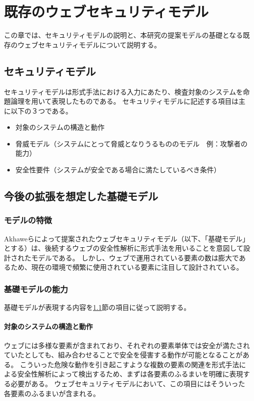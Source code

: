 \documentclass[12pt,a4paper]{jbook}
\begin{document}
\chapter{既存のウェブセキュリティモデル}
\label{sec:existing-model}
この章では、セキュリティモデルの説明と、本研究の提案モデルの基礎となる既存のウェブセキュリティモデルについて説明する。

\section{セキュリティモデル}
\label{sec:SecurityModel}
セキュリティモデルは形式手法における入力にあたり、検査対象のシステムを命題論理を用いて表現したものである。
セキュリティモデルに記述する項目は主に以下の３つである。
\begin{itemize}
\item 対象のシステムの構造と動作
\item 脅威モデル（システムにとって脅威となりうるもののモデル　例：攻撃者の能力）
\item 安全性要件（システムが安全である場合に満たしているべき条件）
\end{itemize}

\section{今後の拡張を想定した基礎モデル}
\label{sec:based-model}

\subsection{モデルの特徴}
\label{sec:based-model-abstract}
Akhaweらによって提案されたウェブセキュリティモデル\cite{based-model}（以下、「基礎モデル」とする）は、後続するウェブの安全性解析に形式手法を用いることを意図して設計されたモデルである。
しかし、ウェブで運用されている要素の数は膨大であるため、現在の環境で頻繁に使用されている要素に注目して設計されている。

\subsection{基礎モデルの能力}
\label{sec:based-model-power}
基礎モデルが表現する内容を\ref{sec:SecurityModel}節の項目に従って説明する。

\subsubsection{対象のシステムの構造と動作}
ウェブには多様な要素が含まれており、それぞれの要素単体では安全が満たされていたとしても、組み合わせることで安全を侵害する動作が可能となることがある。
こういった危険な動作を引き起こすような複数の要素の関連を形式手法による安全性解析によって検出するため、まずは各要素のふるまいを明確に表現する必要がある。
ウェブセキュリティモデルにおいて、この項目にはそういった各要素のふるまいが含まれる。
\end{document}
